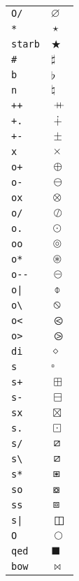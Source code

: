 \begin{longtable}{ll}
\texttt{O/}&${}\varnothing {}$\\
\texttt{*}&${}\star {}$\\
\texttt{starb}&${}\bigstar {}$\\
\texttt{\#}&${}\sharp {}$\\
\texttt{b}&${}\flat {}$\\
\texttt{n}&${}\natural {}$\\
\texttt{++}&${}\mathbin{{+}\mspace{-8mu}{+}} {}$\\
\texttt{+.}&${}\dotplus {}$\\
\texttt{+{-}}&${}\pm {}$\\
\texttt{x}&${}\times {}$\\
\texttt{o+}&${}\oplus {}$\\
\texttt{o{-}}&${}\ominus {}$\\
\texttt{ox}&${}\otimes {}$\\
\texttt{o/}&${}\oslash {}$\\
\texttt{o.}&${}\odot {}$\\
\texttt{oo}&${}\circledcirc {}$\\
\texttt{o*}&${}\circledast {}$\\
\texttt{o{-}{-}}&${}\circleddash {}$\\
\texttt{o|}&${}\obar {}$\\
\texttt{o\textbackslash }&${}\obslash {}$\\
\texttt{o<}&${}\olessthan {}$\\
\texttt{o>}&${}\ogreaterthan {}$\\
\texttt{di}&${}\diamond {}$\\
\texttt{s}&${}\square {}$\\
\texttt{s+}&${}\boxplus {}$\\
\texttt{s{-}}&${}\boxminus {}$\\
\texttt{sx}&${}\boxtimes {}$\\
\texttt{s.}&${}\boxdot {}$\\
\texttt{s/}&${}\boxslash {}$\\
\texttt{s\textbackslash }&${}\boxslash {}$\\
\texttt{s*}&${}\boxast {}$\\
\texttt{so}&${}\boxcircle {}$\\
\texttt{ss}&${}\boxbox {}$\\
\texttt{s|}&${}\boxbar {}$\\
\texttt{O}&${}\bigcirc {}$\\
\texttt{qed}&${}\blacksquare {}$\\
\texttt{bow}&${}\bowtie {}$\\

\end{longtable}
